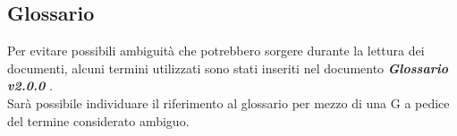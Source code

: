 \subsection{Glossario}
Per evitare possibili ambiguità che potrebbero sorgere durante la lettura dei documenti,
alcuni termini utilizzati sono stati inseriti nel documento \textbf{\textit{Glossario v2.0.0 }}. \\
Sarà possibile individuare il riferimento al glossario per mezzo di una G a pedice del termine considerato ambiguo.